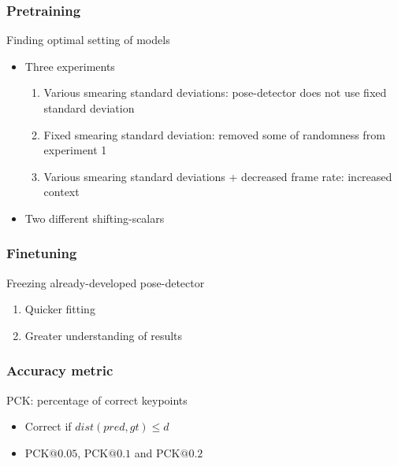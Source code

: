 \documentclass{beamer}
\begin{document}
\begin{frame}
    \frametitle{Pretraining}
    Finding optimal setting of models
    \begin{itemize}
        \item<1-> Three experiments
        \begin{enumerate}
            \item<1-> Various smearing standard deviations: pose-detector does not use fixed standard deviation
            \item<2-> Fixed smearing standard deviation: removed some of randomness from experiment 1
            \item<3-> Various smearing standard deviations + decreased frame rate: increased context
        \end{enumerate}
        \item<4-> Two different shifting-scalars
    \end{itemize}
\end{frame}

\begin{frame}
    \frametitle{Finetuning}
    Freezing already-developed pose-detector
        \begin{enumerate}
            \item Quicker fitting
            \item Greater understanding of results  
        \end{enumerate}
\end{frame}

\begin{frame}
    \frametitle{Accuracy metric}
    PCK: percentage of correct keypoints
    \begin{itemize}
        \item Correct if $dist(pred, gt) \leq d$
        \item PCK$@0.05$, PCK$@0.1$ and PCK$@0.2$ 
    \end{itemize}
\end{frame}
\end{document}
